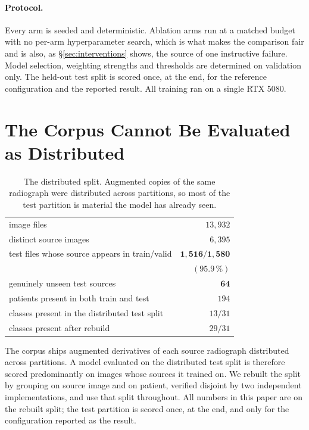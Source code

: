 \documentclass[10pt,twocolumn,letterpaper]{article}
\begin{document}
\paragraph{Protocol.} Every arm is seeded and deterministic. Ablation arms run at
a matched budget with no per-arm hyperparameter search, which is what makes the
comparison fair and is also, as \S\ref{sec:interventions} shows, the source of one
instructive failure. Model selection, weighting strengths and thresholds are
determined on validation only. The held-out test split is scored once, at the
end, for the reference configuration and the reported result. All training ran on
a single RTX 5080.

\section{The Corpus Cannot Be Evaluated as Distributed}

\begin{table}[t]\centering\small
\begin{tabular}{lr}
\toprule
image files & $13{,}932$ \\
distinct source images & $6{,}395$ \\
test files whose source appears in train/valid & $\mathbf{1{,}516/1{,}580}$ \\
& $(\mathbf{95.9\,\%})$ \\
genuinely unseen test sources & $\mathbf{64}$ \\
patients present in both train and test & $194$ \\
classes present in the distributed test split & $13/31$ \\
classes present after rebuild & $29/31$ \\
\bottomrule
\end{tabular}
\caption{The distributed split. Augmented copies of the same radiograph were
distributed across partitions, so most of the test partition is material the
model has already seen.}
\end{table}

The corpus ships augmented derivatives of each source radiograph distributed
across partitions. A model evaluated on the distributed test split is therefore
scored predominantly on images whose sources it trained on. We rebuilt the split
by grouping on source image and on patient, verified disjoint by two independent
implementations, and use that split throughout. All numbers in this paper are on
the rebuilt split; the test partition is scored once, at the end, and only for
the configuration reported as the result.
\end{document}

